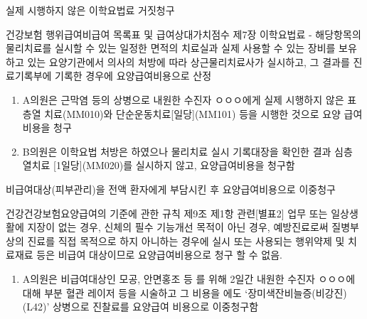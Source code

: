 \begin{commentbox}{실제 시행하지 않은 이학요법료 거짓청구}
\begin{description}\tightlist
\item[관련근거] 건강보험 행위급여\cntrdot{}비급여 목록표 및 급여상대가치점수 제7장 이학요법료 - 해당항목의 물리치료를 실시할 수 있는 일정한 면적의 치료실과 실제 사용할 수 있는 장비를 보유하고 있는 요양기관에서 의사의 처방에 따라 상근물리치료사가 실시하고, 그 결과를 진료기록부에 기록한 경우에 요양급여비용으로 산정
\item[부당사례]
\begin{enumerate}[1)]\tightlist
\item  A의원은 근막염 등의 상병으로 내원한 수진자 ㅇㅇㅇ에게 실제 시행하지 않은 표층열 치료(MM010)와 단순운동치료[일당](MM101) 등을 시행한 것으로 요양 급여비용을 청구
\item B의원은 이학요법 처방은 하였으나 물리치료 실시 기록대장을 확인한 결과 심층 열치료 [1일당](MM020)를 실시하지 않고, 요양급여비용을 청구함
\end{enumerate}
\end{description}
\end{commentbox}

비급여대상(피부관리)을 전액 환자에게 부담시킨 후 요양급여비용으로 이중청구
\begin{description}\tightlist
\item[관련근거] 건강건강보험요양급여의 기준에 관한 규칙 제9조 제1항 관련[별표2] 업무 또는 일상생활에 지장이 없는 경우, 신체의 필수 기능개선 목적이 아닌 경우, 예방진료로써 질병\cntrdot{}부상의 진료를 직접 목적으로 하지 아니하는 경우에 실시 또는 사용되는 행위\cntrdot{}약제 및 치료재료 등은 비급여 대상이므로 요양급여비용으로 청구 할 수 없음.
\item[부당사례]
\begin{enumerate}[1)]\tightlist
\item  A의원은 비급여대상인 모공, 안면홍조 등 를 위해 2일간 내원한 수진자 ㅇㅇㅇ에 대해 부분 혈관 레이저 등을 시술하고 그 비용을 에도 ‘장미색잔비늘증(비강진)(L42)’ 상병으로 진찰료를 요양급여 비용으로 이중청구함
\end{enumerate}
\end{description}


